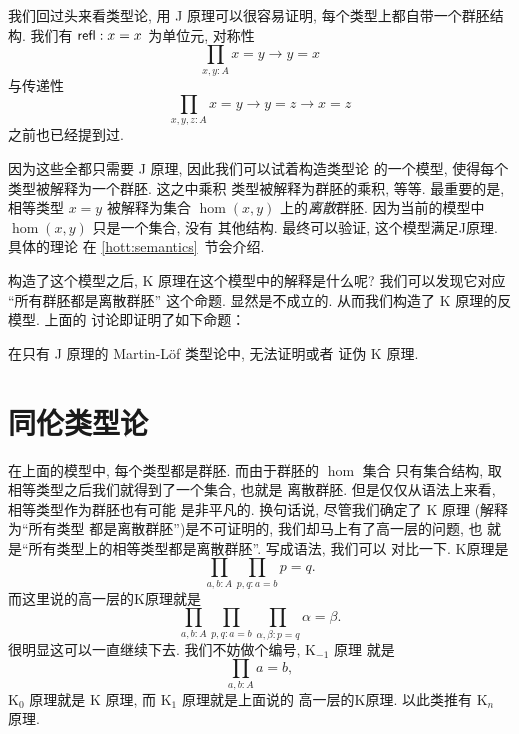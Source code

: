 我们回过头来看类型论, 用 J 原理可以很容易证明,
每个类型上都自带一个群胚结构.
我们有 \(\textnormal{\textsf{refl}} : x = x\) 为单位元, 对称性
\[\prod_{x, y : A} x = y \to y = x\]
与传递性
\[\prod_{x,y,z : A} x = y \to y = z \to x = z\]
之前也已经提到过.

因为这些全都只需要 J 原理, 因此我们可以试着构造类型论
的一个模型, 使得每个类型被解释为一个群胚. 这之中乘积
类型被解释为群胚的乘积, 等等. 最重要的是, 相等类型
\(x = y\) 被解释为集合 \(\hom(x,y)\) 上的\emph{离散}群胚.
因为当前的模型中 \(\hom(x,y)\) 只是一个集合, 没有
其他结构. 最终可以验证, 这个模型满足J原理. 具体的理论
在 \ref{hott:semantics}~节会介绍.

构造了这个模型之后, K 原理在这个模型中的解释是什么呢?
我们可以发现它对应 “所有群胚都是离散群胚” 这个命题.
显然是不成立的. 从而我们构造了 K 原理的反模型. 上面的
讨论即证明了如下命题：
\begin{theorem}
在只有 J 原理的 Martin-L\"of 类型论中, 无法证明或者
证伪 K 原理.
\end{theorem}

\section{同伦类型论}
在上面的模型中, 每个类型都是群胚. 而由于群胚的 \(\hom\) 集合
只有集合结构, 取相等类型之后我们就得到了一个集合, 也就是
离散群胚. 但是仅仅从语法上来看, 相等类型作为群胚也有可能
是非平凡的. 换句话说, 尽管我们确定了 K 原理 (解释为“所有类型
都是离散群胚”)是不可证明的, 我们却马上有了高一层的问题, 也
就是“所有类型上的相等类型都是离散群胚”. 写成语法, 我们可以
对比一下. K原理是
\[\prod_{a,b : A} \prod_{p,q:a=b} p = q.\]
而这里说的高一层的K原理就是
\[\prod_{a,b : A} \prod_{p,q:a=b} \prod_{\alpha,\beta:p=q} \alpha = \beta.\]
很明显这可以一直继续下去. 我们不妨做个编号, K\(_{-1}\) 原理
就是
\[\prod_{a,b : A} a = b,\]
K\(_0\) 原理就是 K 原理, 而 K\(_1\) 原理就是上面说的
高一层的K原理. 以此类推有 K\(_n\) 原理.

